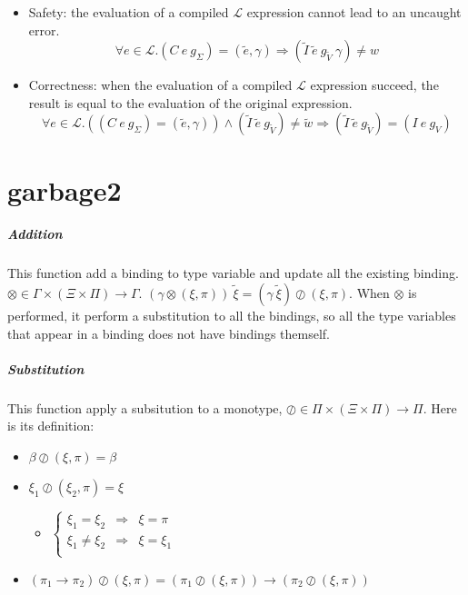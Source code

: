 \documentclass[a4paper]{report}
\newcommand{\lang}[0]{\mathcal{L}}
\newcommand{\locus}[1]{\widetilde{#1}}
\begin{document}
\begin{itemize}
\item Safety: the evaluation of a compiled $\lang$ expression cannot lead to an uncaught error.
$$\forall e\in \lang.(C\ e\ g_\Sigma)=(\locus e,\gamma)\Rightarrow (\locus I\ \locus e\ g_{\locus V}\ \gamma)\neq w$$
\item Correctness: when the evaluation of a compiled $\lang$ expression succeed, the result is equal to the evaluation of the original expression.
$$\forall e\in \lang.((C\ e\ g_\Sigma)=(\locus e,\gamma))\wedge (\locus I\ \locus e\ g_{\locus V})\neq \locus w \Rightarrow (\locus I\ \locus e\ g_{\locus V})=(I\ e\ g_V)$$
\end{itemize}


\chapter{garbage2}


\paragraph{Addition} This function add a binding to type variable and update all the existing binding. $\otimes\in \Gamma\times(\Xi\times\Pi)\to\Gamma$. $(\gamma\otimes(\xi,\pi))\ \tilde\xi=(\gamma\ \tilde\xi)\oslash(\xi,\pi)$. When $\otimes$ is performed, it perform a substitution to all the bindings, so all the type variables that appear in a binding does not have bindings themself.

\paragraph{Substitution} This function apply a subsitution to a monotype, $\oslash\in\Pi\times(\Xi\times\Pi)\to\Pi$. Here is its definition:
\begin{itemize}
\item $\beta\oslash(\xi,\pi)=\beta$
\item $\xi_1\oslash(\xi_2,\pi)=\xi$
	\begin{itemize}
	\item $\left\{\begin{array}{ccl}
		\xi_1=\xi_2&\Rightarrow&\xi=\pi\\
		\xi_1\neq\xi_2&\Rightarrow&\xi=\xi_1\\
		\end{array}\right.$
	\end{itemize}
\item $(\pi_1\to\pi_2)\oslash(\xi,\pi)=(\pi_1\oslash(\xi,\pi))\to(\pi_2\oslash(\xi,\pi))$
\end{itemize}
\end{document}
